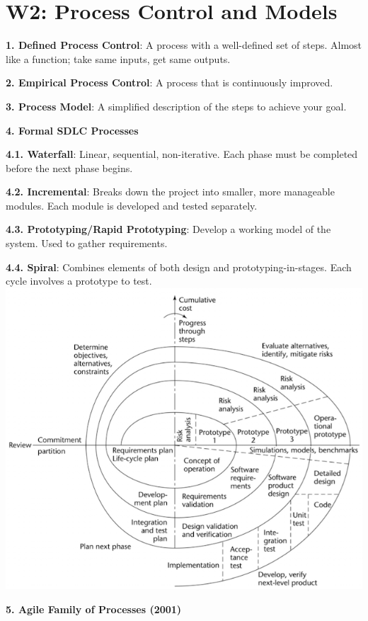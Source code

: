 \section{W2: Process Control and Models}

\textbf{1. Defined Process Control}: A process with a well-defined set of steps. Almost like a function; take same inputs, get same outputs.

\textbf{2. Empirical Process Control}: A process that is continuously improved.

\textbf{3. Process Model}: A simplified description of the steps to achieve your goal.

\textbf{4. Formal SDLC Processes}

    \textbf{4.1. Waterfall}: Linear, sequential, non-iterative. Each phase must be completed before the next phase begins.

    \textbf{4.2. Incremental}: Breaks down the project into smaller, more manageable modules. Each module is developed and tested separately.

    \textbf{4.3. Prototyping/Rapid Prototyping}: Develop a working model of the system. Used to gather requirements.

    \textbf{4.4. Spiral}: Combines elements of both design and prototyping-in-stages. Each cycle involves a prototype to test.
    \includegraphics[width=\linewidth]{figs/SCR-20240605-oywi.png}


\textbf{5. Agile Family of Processes (2001)}

